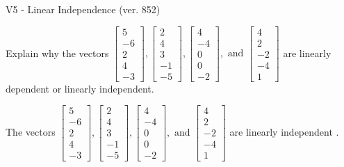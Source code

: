 \begin{exercise}
  \begin{exerciseTitle}V5 - Linear Independence (ver. 852)\end{exerciseTitle}
  \begin{exerciseStatement}
    Explain why the vectors \(\left[\begin{array}{r}
5 \\
-6 \\
2 \\
4 \\
-3
\end{array}\right] , \left[\begin{array}{r}
2 \\
4 \\
3 \\
-1 \\
-5
\end{array}\right] , \left[\begin{array}{r}
4 \\
-4 \\
0 \\
0 \\
-2
\end{array}\right] , \text{ and } \left[\begin{array}{r}
4 \\
2 \\
-2 \\
-4 \\
1
\end{array}\right]\) are linearly dependent or linearly independent.	


  \end{exerciseStatement}
  \begin{exerciseAnswer}
   The vectors \(\left[\begin{array}{r}
5 \\
-6 \\
2 \\
4 \\
-3
\end{array}\right] , \left[\begin{array}{r}
2 \\
4 \\
3 \\
-1 \\
-5
\end{array}\right] , \left[\begin{array}{r}
4 \\
-4 \\
0 \\
0 \\
-2
\end{array}\right] , \text{ and } \left[\begin{array}{r}
4 \\
2 \\
-2 \\
-4 \\
1
\end{array}\right]\) are 
  	 linearly independent  .
  


  \end{exerciseAnswer}
\end{exercise}